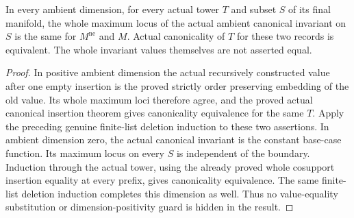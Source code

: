 \begin{theorem}
\label{hir:original-boundary-empty-filter-canonical}
\leanok
In every ambient dimension, for every actual tower $T$ and subset $S$
of its final manifold, the whole maximum locus of the actual ambient
canonical invariant on $S$ is the same for $M^{\mathrm{ne}}$ and $M$.
Actual canonicality of $T$ for these two records is equivalent. The
whole invariant values themselves are not asserted equal.
\end{theorem}
\begin{proof}
In positive ambient dimension the actual recursively constructed value
after one empty insertion is the proved strictly order preserving
embedding of the old value. Its whole maximum loci therefore agree,
and the proved actual canonical insertion theorem gives canonicality
equivalence for the same $T$. Apply the preceding genuine finite-list
deletion induction to these two assertions. In ambient dimension zero,
the actual canonical invariant is the constant base-case function.
Its maximum locus on every $S$ is independent of the boundary. Induction
through the actual tower, using the already proved whole cosupport
insertion equality at every prefix, gives canonicality equivalence.
The same finite-list deletion induction completes this dimension as
well. Thus no value-equality substitution or dimension-positivity guard
is hidden in the result.
\end{proof}

